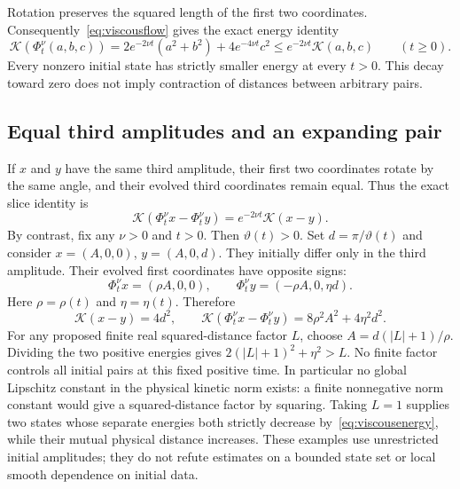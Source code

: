 \documentclass[11pt]{article}
\begin{document}
Rotation preserves the squared length of the first two coordinates.
Consequently~\eqref{eq:viscousflow} gives the exact energy identity
\begin{equation}\label{eq:viscousenergy}
 \mathcal K(\Phi_t^\nu(a,b,c))
 =2e^{-2\nu t}(a^2+b^2)+4e^{-4\nu t}c^2
 \leq e^{-2\nu t}\mathcal K(a,b,c)\qquad(t\geq0).
\end{equation}
Every nonzero initial state has strictly smaller energy at every
$t>0$. This decay toward zero does not imply contraction of
distances between arbitrary pairs.

\subsection*{Equal third amplitudes and an expanding pair}
If $x$ and $y$ have the same third amplitude, their first two
coordinates rotate by the same angle, and their evolved third
coordinates remain equal. Thus the exact slice identity is
\[
 \mathcal K(\Phi_t^\nu x-\Phi_t^\nu y)
       =e^{-2\nu t}\mathcal K(x-y).
\]
By contrast, fix any $\nu>0$ and $t>0$. Then $\vartheta(t)>0$.
Set $d=\pi/\vartheta(t)$ and consider
$x=(A,0,0)$, $y=(A,0,d)$. They initially differ only in the
third amplitude. Their evolved first coordinates have opposite signs:
\[
 \Phi_t^\nu x=(\rho A,0,0),\qquad
 \Phi_t^\nu y=(-\rho A,0,\eta d).
\]
Here $\rho=\rho(t)$ and $\eta=\eta(t)$. Therefore
\begin{equation}\label{eq:triadamplification}
 \mathcal K(x-y)=4d^2,\qquad
 \mathcal K(\Phi_t^\nu x-\Phi_t^\nu y)
                  =8\rho^2A^2+4\eta^2d^2.
\end{equation}
For any proposed finite real squared-distance factor $L$, choose
$A=d(|L|+1)/\rho$. Dividing the two positive energies gives
$2(|L|+1)^2+\eta^2>L$. No finite factor controls all initial
pairs at this fixed positive time. In particular no global Lipschitz
constant in the physical kinetic norm exists: a finite nonnegative
norm constant would give a squared-distance factor by squaring.
Taking $L=1$ supplies two states whose separate energies both strictly
decrease by~\eqref{eq:viscousenergy}, while their mutual physical
distance increases. These examples use unrestricted initial amplitudes;
they do not refute estimates on a bounded state set or local smooth
dependence on initial data.
\end{document}
